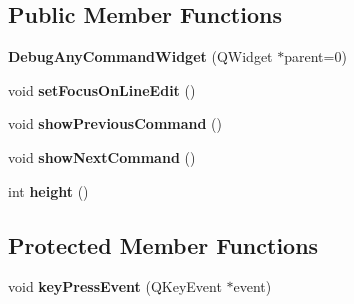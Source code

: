\subsection*{Public Member Functions}
\begin{DoxyCompactItemize}
\item 
\hypertarget{class_debug_any_command_widget_ac518c5bebbf8b31eee1ea7863efea2fe}{}{\bfseries Debug\+Any\+Command\+Widget} (Q\+Widget $\ast$parent=0)\label{class_debug_any_command_widget_ac518c5bebbf8b31eee1ea7863efea2fe}

\item 
\hypertarget{class_debug_any_command_widget_a98dcf97a1ebf2a2a523dba4fa9553456}{}void {\bfseries set\+Focus\+On\+Line\+Edit} ()\label{class_debug_any_command_widget_a98dcf97a1ebf2a2a523dba4fa9553456}

\item 
\hypertarget{class_debug_any_command_widget_a0d5feefc9967dffc9ea4583fe909f815}{}void {\bfseries show\+Previous\+Command} ()\label{class_debug_any_command_widget_a0d5feefc9967dffc9ea4583fe909f815}

\item 
\hypertarget{class_debug_any_command_widget_aab67e1561b7532fb08ae3e60184e96b4}{}void {\bfseries show\+Next\+Command} ()\label{class_debug_any_command_widget_aab67e1561b7532fb08ae3e60184e96b4}

\item 
\hypertarget{class_debug_any_command_widget_aecb771425d29dfa3703c190bd2f027f2}{}int {\bfseries height} ()\label{class_debug_any_command_widget_aecb771425d29dfa3703c190bd2f027f2}

\end{DoxyCompactItemize}
\subsection*{Protected Member Functions}
\begin{DoxyCompactItemize}
\item 
\hypertarget{class_debug_any_command_widget_a14bbbbb6eb17d6f15bcc6ecd4e3e5aee}{}void {\bfseries key\+Press\+Event} (Q\+Key\+Event $\ast$event)\label{class_debug_any_command_widget_a14bbbbb6eb17d6f15bcc6ecd4e3e5aee}

\end{DoxyCompactItemize}
